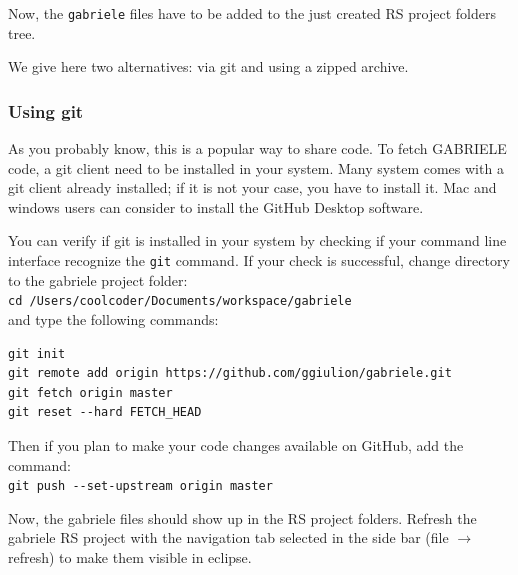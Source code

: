\documentclass{book}
\begin{document}

\vskip2mm
Now, the \verb+gabriele+ files have to be added to the just created RS project folders tree.

We give here two alternatives: via git and using a zipped archive.

\subsubsection{Using git}

As you probably know, this is a popular way to share code. %
To fetch GABRIELE code, a git client need to be installed in your system. Many system comes with a git client already installed; if it is not your case, you have to install it. Mac and windows users can consider to install the GitHub Desktop software.

You can verify if git is installed in your system by checking if your command line interface recognize the \verb+git+ command.  
If your check is successful, change directory to the gabriele project folder:\\
\verb+cd /Users/coolcoder/Documents/workspace/gabriele+\\
and type the following commands:
\begin{verbatim}
git init
git remote add origin https://github.com/ggiulion/gabriele.git
git fetch origin master
git reset --hard FETCH_HEAD
\end{verbatim}

Then if you plan to make your code changes available on GitHub, add the command:\\
\verb+git push --set-upstream origin master+

Now, the gabriele files should show up in the RS project folders.
Refresh the gabriele RS project with the navigation tab selected in the side bar (file $\rightarrow$ refresh) to make them visible in eclipse.
\end{document}
